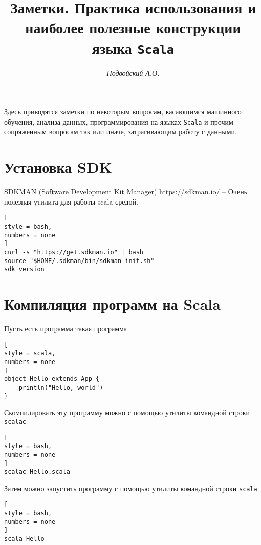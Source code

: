 \documentclass[%
	11pt,
	a4paper,
	utf8,
		]{article}
\begin{document}
\title{Заметки. Практика использования и наиболее полезные конструкции языка \texttt{Scala}}

\author{\itshape Подвойский А.О.}

\date{}
\maketitle

\thispagestyle{fancy}

Здесь приводятся заметки по некоторым вопросам, касающимся машинного обучения, анализа данных, программирования на языках \texttt{Scala} и прочим сопряженным вопросам так или иначе, затрагивающим работу с данными.



\tableofcontents

\section{Установка SDK}

SDKMAN (Software Development Kit Manager) \url{https://sdkman.io/} -- Очень полезная утилита для работы scala-средой.

\begin{lstlisting}[
style = bash,
numbers = none	
]
curl -s "https://get.sdkman.io" | bash
source "$HOME/.sdkman/bin/sdkman-init.sh"
sdk version
\end{lstlisting}

\section{Компиляция программ на Scala}

Пусть есть программа такая программа
\begin{lstlisting}[
style = scala,
numbers = none	
]
object Hello extends App {
	println("Hello, world")
}
\end{lstlisting}

Скомпилировать эту программу можно с помощью утилиты командной строки \texttt{scalac}
\begin{lstlisting}[
style = bash,
numbers = none	
]
scalac Hello.scala
\end{lstlisting}

Затем можно запустить программу с помощью утилиты командной строки \texttt{scala}
\begin{lstlisting}[
style = bash,
numbers = none	
]
scala Hello
\end{lstlisting}
\end{document}
